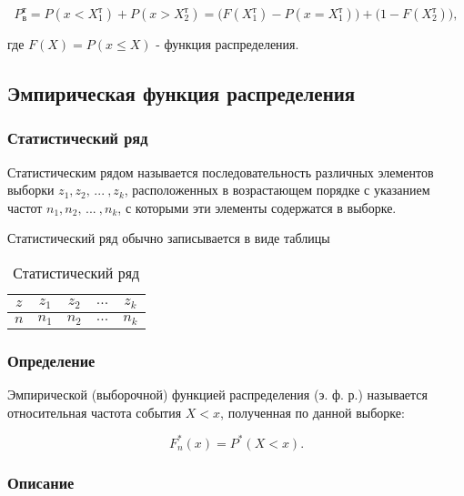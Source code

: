 \documentclass[report.tex]{subfiles}
\begin{document}
\begin{equation} \label{eq:probTheorDisc}
    P_\text{в}^\text{т} = P(x < X_1^\text{т}) + P(x > X_2^\text{т}) = \Big(F(X_1^\text{т}) - P(x = X_1^\text{т})\Big) + \Big(1 - F(X_2^\text{т})\Big),
\end{equation}

где $F(X) = P(x \le X)$ - функция распределения.

\subsection{Эмпирическая функция распределения}

\subsubsection{Статистический ряд}

Статистическим рядом называется последовательность различных элементов выборки $z_1, z_2, \, ... \: , z_k$, расположенных в возрастающем порядке с указанием частот $n_1, n_2, \, ... \: , n_k$, с которыми эти элементы содержатся в выборке.

Статистический ряд обычно записывается в виде таблицы

\begin{table}[h!]
\begin{center}
\begin{tabular}{|c|c|c|c|c|}
\hline
$z$ & $z_1$ & $z_2$ & $...$ & $z_k$ \\
\hline
$n$ & $n_1$ & $n_2$ & $...$ & $n_k$ \\
\hline
\end{tabular}
\end{center}
\caption{Статистический ряд}
\end{table} 

\subsubsection{Определение}

Эмпирической (выборочной) функцией распределения (э. ф. р.) называется относительная частота события $X < x$, полученная по данной выборке:

\begin{equation}
    F_n^*(x) = P^*(X < x).
\end{equation}

\subsubsection{Описание}
\end{document}
